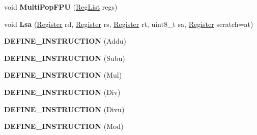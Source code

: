 \begin{DoxyCompactItemize}
\item 
\mbox{\label{classv8_1_1internal_1_1TurboAssembler_accabeb1ab4512c3234af504802c7ab01}} 
void {\bfseries Multi\+Pop\+F\+PU} (\mbox{\hyperlink{classuint32__t}{Reg\+List}} regs)
\item 
\mbox{\label{classv8_1_1internal_1_1TurboAssembler_abdff70f000ff6a6f92da7521268a6704}} 
void {\bfseries Lsa} (\mbox{\hyperlink{classv8_1_1internal_1_1Register}{Register}} rd, \mbox{\hyperlink{classv8_1_1internal_1_1Register}{Register}} rs, \mbox{\hyperlink{classv8_1_1internal_1_1Register}{Register}} rt, uint8\+\_\+t sa, \mbox{\hyperlink{classv8_1_1internal_1_1Register}{Register}} scratch=at)
\item 
\mbox{\label{classv8_1_1internal_1_1TurboAssembler_a17dd06005b1dfdd7553b1d382162c505}} 
{\bfseries D\+E\+F\+I\+N\+E\+\_\+\+I\+N\+S\+T\+R\+U\+C\+T\+I\+ON} (Addu)
\item 
\mbox{\label{classv8_1_1internal_1_1TurboAssembler_ae74ef729bdb6df58fb6ef0a4797d106d}} 
{\bfseries D\+E\+F\+I\+N\+E\+\_\+\+I\+N\+S\+T\+R\+U\+C\+T\+I\+ON} (Subu)
\item 
\mbox{\label{classv8_1_1internal_1_1TurboAssembler_adddaeaf0bacb29b147ed70a6896ad7c5}} 
{\bfseries D\+E\+F\+I\+N\+E\+\_\+\+I\+N\+S\+T\+R\+U\+C\+T\+I\+ON} (Mul)
\item 
\mbox{\label{classv8_1_1internal_1_1TurboAssembler_a9021370ecc3d533227d7b7434a40b4d7}} 
{\bfseries D\+E\+F\+I\+N\+E\+\_\+\+I\+N\+S\+T\+R\+U\+C\+T\+I\+ON} (Div)
\item 
\mbox{\label{classv8_1_1internal_1_1TurboAssembler_a9c85f2d40fc9d409e7f2df54ecefce9b}} 
{\bfseries D\+E\+F\+I\+N\+E\+\_\+\+I\+N\+S\+T\+R\+U\+C\+T\+I\+ON} (Divu)
\item 
\mbox{\label{classv8_1_1internal_1_1TurboAssembler_aebe8ff768d43620c1257c881a01f7245}} 
{\bfseries D\+E\+F\+I\+N\+E\+\_\+\+I\+N\+S\+T\+R\+U\+C\+T\+I\+ON} (Mod)
\item 

\end{DoxyCompactItemize}
